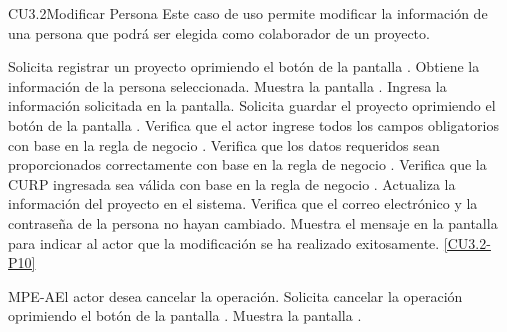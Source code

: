 \begin{UseCase}{CU3.2}{Modificar Persona}{
		Este caso de uso permite modificar la información de una persona que podrá ser elegida como colaborador de un proyecto.
	}
{		}
	\end{UseCase}
	\begin{UCtrayectoria}
		\UCpaso[\UCactor] Solicita registrar un proyecto oprimiendo el botón \editar de la pantalla .
		\UCpaso[\UCsist] Obtiene la información de la persona seleccionada.
		\UCpaso[\UCsist] Muestra la pantalla .
		\UCpaso[\UCactor] Ingresa la información solicitada en la pantalla. \label{CU3.2-P4}
		\UCpaso[\UCactor] Solicita guardar el proyecto oprimiendo el botón  de la pantalla . 
		\UCpaso[\UCsist] Verifica que el actor ingrese todos los campos obligatorios con base en la regla de negocio . 
		\UCpaso[\UCsist] Verifica que los datos requeridos sean proporcionados correctamente con base en la regla de negocio .  
		\UCpaso[\UCsist] Verifica que la CURP ingresada sea válida con base en la regla de negocio . 
		\UCpaso[\UCsist] Actualiza la información del proyecto en el sistema.
		\UCpaso[\UCsist] Verifica que el correo electrónico y la contraseña de la persona no hayan cambiado. 
		\UCpaso[\UCsist] Muestra el mensaje  en la pantalla  para indicar al actor que la modificación se ha realizado exitosamente. \ref{CU3.2-P10}
	\end{UCtrayectoria}		
		\begin{UCtrayectoriaA}{MPE-A}{El actor desea cancelar la operación.}
			\UCpaso[\UCactor] Solicita cancelar la operación oprimiendo el botón  de la pantalla .
			\UCpaso[\UCsist] Muestra la pantalla .
		\end{UCtrayectoriaA}

